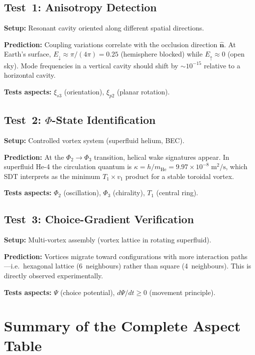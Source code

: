\subsection{Test~1: Anisotropy Detection}

\textbf{Setup:} Resonant cavity oriented along different spatial directions.

\textbf{Prediction:} Coupling variations correlate with the occlusion direction $\hat{\mathbf{n}}$.  At Earth's surface, $E_{\downarrow} \approx \pi/(4\pi) = 0.25$ (hemisphere blocked) while $E_{\uparrow} \approx 0$ (open sky).  Mode frequencies in a vertical cavity should shift by $\sim 10^{-15}$ relative to a horizontal cavity.

\textbf{Tests aspects:} $\xi_{s3}$ (orientation), $\xi_{p2}$ (planar rotation).

\subsection{Test~2: $\Phi$-State Identification}

\textbf{Setup:} Controlled vortex system (superfluid helium, BEC).

\textbf{Prediction:} At the $\Phi_2 \to \Phi_3$ transition, helical wake signatures appear.  In superfluid He-4 the circulation quantum is $\kappa = h/m_{\text{He}} = 9.97 \times 10^{-8}\;\text{m}^2\text{/s}$, which SDT interprets as the minimum $T_1 \times v_1$ product for a stable toroidal vortex.

\textbf{Tests aspects:} $\Phi_2$ (oscillation), $\Phi_3$ (chirality), $T_1$ (central ring).

\subsection{Test~3: Choice-Gradient Verification}

\textbf{Setup:} Multi-vortex assembly (vortex lattice in rotating superfluid).

\textbf{Prediction:} Vortices migrate toward configurations with more interaction paths---i.e.\ hexagonal lattice (6~neighbours) rather than square (4~neighbours).  This is directly observed experimentally.

\textbf{Tests aspects:} $\Psi$ (choice potential), $d\Psi/dt \ge 0$ (movement principle).


\section{Summary of the Complete Aspect Table}

